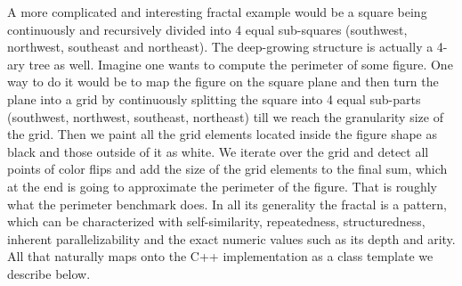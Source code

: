 \documentclass[10pt,a4paper]{report}
\begin{document}
\quad A more complicated and interesting fractal example would be a square being continuously and recursively divided into 4 equal sub-squares (southwest, northwest, southeast and northeast). The deep-growing structure is actually a 4-ary tree as well. Imagine one wants to compute the perimeter of some figure. One way to do it would be to map the figure on the square plane and then turn the plane into a grid by continuously splitting the square into 4 equal sub-parts (southwest, northwest, southeast, northeast) till we reach the granularity size of the grid. Then we paint all the grid elements located inside the figure shape as black and those outside of it as white. We iterate over the grid and detect all points of color flips and add the size of the grid elements to the final sum, which at the end is going to approximate the perimeter of the figure. That is roughly what the perimeter benchmark does.\newline\null
\quad In all its generality the fractal is a pattern, which can be characterized with self-similarity, repeatedness, structuredness, inherent parallelizability and the exact numeric values such as its depth and arity. All that naturally maps onto the C++ implementation as a class template we describe below.
\end{document}
